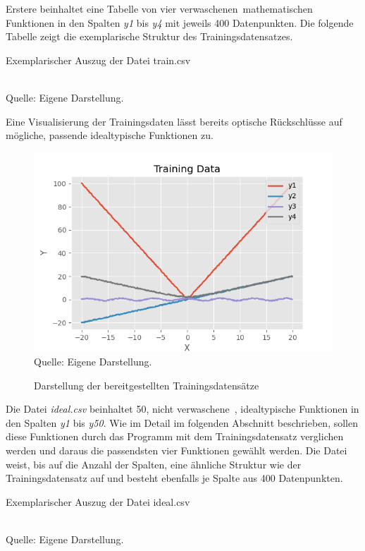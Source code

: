 Erstere beinhaltet eine Tabelle von vier \glqq verwaschenen\grqq\ mathematischen Funktionen in den Spalten \emph{y1} bis \emph{y4} mit jeweils 400 Datenpunkten. Die folgende Tabelle zeigt die exemplarische Struktur des Trainingsdatensatzes.

\begin{table}[H]
\small
\centering
\caption{Exemplarischer Auszug der Datei train.csv}
\\
Quelle: Eigene Darstellung.
\label{tab:train.csv}
\end{table} 


Eine Visualisierung der Trainingsdaten lässt bereits optische Rückschlüsse auf mögliche, passende idealtypische Funktionen zu.

\begin{figure}[h]
\centering
\caption{Darstellung der bereitgestellten Trainingsdatensätze}
\includegraphics[width=13cm]{../output/figures/train.png}\\
Quelle: Eigene Darstellung.
\label{fig:train}
\end{figure}

Die Datei \emph{ideal.csv} beinhaltet 50, nicht \glqq verwaschene\grqq\ , idealtypische Funktionen in den Spalten \emph{y1} bis \emph{y50}. Wie im Detail im folgenden Abschnitt beschrieben, sollen diese Funktionen durch das Programm mit dem Trainingsdatensatz verglichen werden und daraus die passendsten vier Funktionen gewählt werden. Die Datei weist, bis auf die Anzahl der Spalten, eine ähnliche Struktur wie der Trainingsdatensatz auf und besteht ebenfalls je Spalte aus 400 Datenpunkten. 

\begin{table}[H]
\small
\centering
\caption{Exemplarischer Auszug der Datei ideal.csv}
\\
Quelle: Eigene Darstellung.
\label{tab:ideal.csv}
\end{table} 

